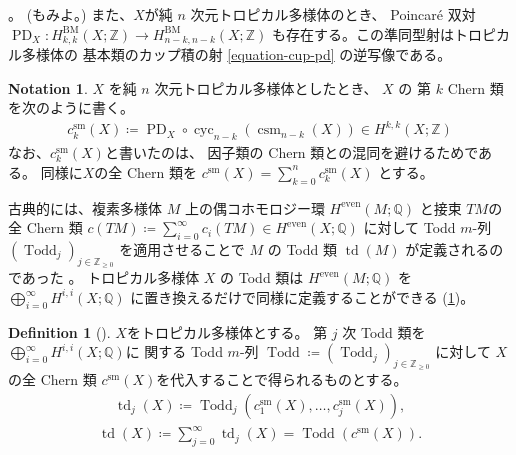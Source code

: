 \documentclass[a4paper,dvipdfmx,reqno,12pt]{amsart}
\theoremstyle{definition}
\newtheorem{definition}[theorem]{Definition}
\newtheorem{notation}[theorem]{Notation}
\newcommand{\deq}{\coloneqq}
\newcommand{\opn}[1]{\operatorname{#1}}
\numberwithin{equation}{section}
\begin{document}
\cite[Definition 5.4]{MR4637248}。
(\cite[Definition 4.13]{MR3894860}もみよ。)
また、$X$が純 $n$ 次元トロピカル多様体のとき、
Poincar\'e 双対
$\opn{PD}_X\colon H_{k,k}^{\opn{BM}}(X;\mathbb{Z})
\to H_{n-k,n-k}^{\opn{BM}}(X;\mathbb{Z})$
も存在する。この準同型射はトロピカル多様体の
基本類のカップ積の射 \eqref{equation-cup-pd}
の逆写像である。

\begin{notation}
$X$ を純 $n$ 次元トロピカル多様体としたとき、
$X$ の 第 $k$ Chern 類を次のように書く。 
\begin{align}
c_{k}^{\mathrm{sm}}(X)\deq
\opn{PD}_X\circ \opn{cyc}_{n-k}(\opn{csm}_{n-k}(X))
\in H^{k,k}(X;\mathbb{Z})
\end{align}
なお、$c_{k}^{\mathrm{sm}}(X)$と書いたのは、
因子類の Chern 類との混同を避けるためである。
同様に$X$の全 Chern 類を
$c^{\mathrm{sm}}(X)=\sum_{k=0}^{n} c_{k}^{\mathrm{sm}}(X)$
とする。
\end{notation}

古典的には、複素多様体 $M$ 上の偶コホモロジー環
$H^{\mathrm{even}}(M;\mathbb{Q})$
と接束 $TM$の全 Chern 類 
$c(TM)\deq \sum_{i=0}^{\infty}c_i(TM)\in 
H^{\mathrm{even}}(X;\mathbb{Q})$
に対して
Todd $m$-列 $(\opn{Todd}_j)_{j\in \mathbb{Z}_{\geq 0}}$
を適用させることで $M$ の Todd 類
$\opn{td}(M)$
が定義されるのであった
\cite[]{MR1335917}。
トロピカル多様体 $X$ の Todd 類は
$H^{\mathrm{even}}(M;\mathbb{Q})$ を
$\bigoplus_{i=0}^{\infty} H^{i,i}(X;\mathbb{Q})$
に置き換えるだけで同様に定義することができる
(\cref{definition-tropical-todd})。

\begin{definition}[{\cite{demedrano2023chern}}]
\label{definition-tropical-todd}
$X$をトロピカル多様体とする。
第 $j$ 次 Todd 類を
$\bigoplus_{i=0}^{\infty} H^{i,i}(X;\mathbb{Q})$に
関する Todd $m$-列 $\opn{Todd}\deq (\opn{Todd}_j)_{j\in \mathbb{Z}_{\geq 0}}$
に対して
$X$ の全 Chern 類
$c^{\mathrm{sm}}(X)$を代入することで得られるものとする。
\begin{align}
\opn{td}_j(X)\deq \opn{Todd}_j(c_{1}^{\mathrm{sm}}(X),
\ldots,c_{j}^{\mathrm{sm}}(X)),
\end{align}
\begin{align}
\opn{td}(X)\deq \sum_{j=0}^{\infty}\opn{td}_j(X)=
\opn{Todd}(c^{\mathrm{sm}}(X)).
\end{align}

\end{definition}
\end{document}
